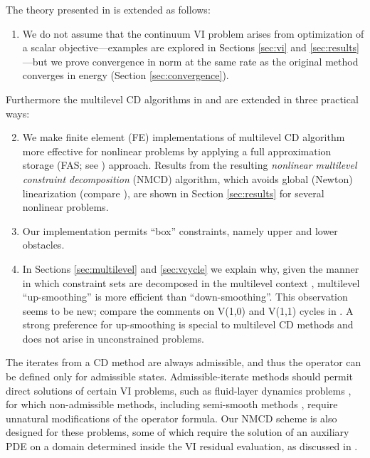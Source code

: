 \documentclass[letterpaper,final,12pt,reqno]{amsart}
\theoremstyle{cstyle}
\theoremstyle{cstyle*}
\theoremstyle{dstyle}
\numberwithin{equation}{section}
\numberwithin{figure}{section}
\numberwithin{table}{section}
\numberwithin{theorem}{section}
\begin{document}
The theory presented in \cite{Tai2003} is extended as follows:
\renewcommand{\labelenumi}{\emph{(\roman{enumi})}}
\begin{enumerate}
\item We do not assume that the continuum VI problem arises from optimization of a scalar objective---examples are explored in Sections \ref{sec:vi} and \ref{sec:results}---but we prove convergence in norm at the same rate as the original method converges in energy (Section \ref{sec:convergence}). %
\end{enumerate}
Furthermore the multilevel CD algorithms in \cite{GraeserKornhuber2009} and \cite{Tai2003} are extended in three practical ways:
\begin{enumerate}
\setcounter{enumi}{1} %
\item We make finite element (FE) implementations of multilevel CD algorithm more effective for nonlinear problems by applying a full approximation storage (FAS; see \cite{Brandt1977,Bruneetal2015}) approach.  Results from the resulting \emph{nonlinear multilevel constraint decomposition} (NMCD) algorithm, which avoids global (Newton) linearization (compare \cite{GraeserKornhuber2009}), are shown in Section \ref{sec:results} for several nonlinear problems.
\item Our implementation permits ``box'' constraints, namely upper and lower obstacles.
\item In Sections \ref{sec:multilevel} and \ref{sec:vcycle} we explain why, given the manner in which constraint sets are decomposed in the multilevel context \cite{GraeserKornhuber2009}, multilevel ``up-smoothing'' is more efficient than ``down-smoothing''.  This observation seems to be new; compare the comments on V(1,0) and V(1,1) cycles in \cite{GraeserKornhuber2009,Tai2003}.  A strong preference for up-smoothing is special to multilevel CD methods and does not arise in unconstrained problems.
\end{enumerate}

The iterates from a CD method are always admissible, and thus the operator can be defined only for admissible states.  Admissible-iterate methods should permit direct solutions of certain VI problems, such as fluid-layer dynamics problems \cite{Bueler2021conservation,JouvetBueler2012}, for which non-admissible methods, including semi-smooth methods \cite{BensonMunson2006}, require unnatural modifications of the operator formula.  Our NMCD scheme is also designed for these problems, some of which require the solution of an auxiliary PDE on a domain determined inside the VI residual evaluation, as discussed in \cite{Bueler2021conservation}.
\end{document}
